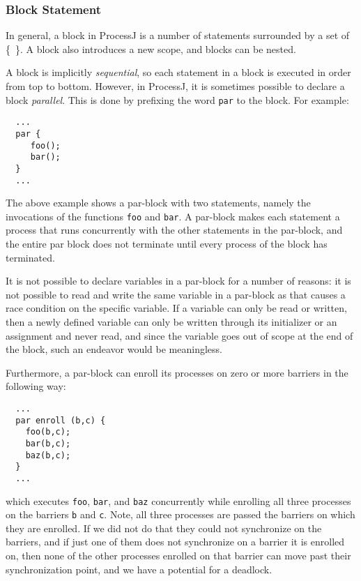 \documentclass[pdflatex,11pt,letter]{article}
\begin{document}
\subsubsection{Block Statement}\label{sec:block}

In general, a block in ProcessJ is a number of statements surrounded by a set of \{\ \}. A block also introduces a new scope, and blocks can be nested.

A block is implicitly {\em sequential}, so each statement in a block is executed in order from top to bottom. However, in ProcessJ, it is sometimes possible to declare a block {\em parallel}. This is done by prefixing the word {\tt par} to the block. For example:
\begin{verbatim}
  ...
  par {
     foo();
     bar();
  }
  ...  
\end{verbatim}
The above example shows a par-block with two statements, namely the invocations of the functions {\tt foo} and {\tt bar}. A par-block makes each statement a process that runs concurrently with the other statements in the par-block, and the entire par block does not terminate until every process of the block has terminated.

It is not possible to declare variables in a par-block for a number of reasons: it is not possible to read and write the same variable in a par-block as that causes a race condition on the specific variable. If a variable can only be read or written, then a newly defined variable can only be written through its initializer or an assignment and never read, and since the variable goes out of scope at the end of the block, such an endeavor would be meaningless.

Furthermore, a par-block can enroll its processes on zero or more barriers in the following way:

\begin{verbatim}
  ...
  par enroll (b,c) {
    foo(b,c);
    bar(b,c);
    baz(b,c);
  }
  ...
\end{verbatim}
which executes {\tt foo}, {\tt bar}, and {\tt baz} concurrently while enrolling all three processes on the barriers {\tt b} and {\tt c}. Note, all three processes are passed the barriers on which they are enrolled. If we did not do that they could not synchronize on the barriers, and if just one of them does not synchronize on a barrier it is enrolled on, then none of the other processes enrolled on that barrier can move past their synchronization point, and we have a potential for a deadlock.
\end{document}
